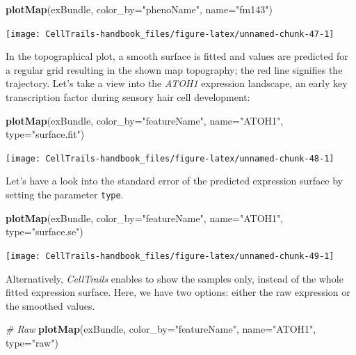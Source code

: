 \documentclass[]{book}
\newenvironment{Shaded}{\begin{snugshade}}{\end{snugshade}}
\newcommand{\KeywordTok}[1]{\textcolor[rgb]{0.13,0.29,0.53}{\textbf{#1}}}
\newcommand{\DataTypeTok}[1]{\textcolor[rgb]{0.13,0.29,0.53}{#1}}
\newcommand{\StringTok}[1]{\textcolor[rgb]{0.31,0.60,0.02}{#1}}
\newcommand{\CommentTok}[1]{\textcolor[rgb]{0.56,0.35,0.01}{\textit{#1}}}
\newcommand{\NormalTok}[1]{#1}
\theoremstyle{definition}
\theoremstyle{definition}
\theoremstyle{definition}
\theoremstyle{remark}
\begin{document}
\begin{Shaded}
\begin{Highlighting}[]
\KeywordTok{plotMap}\NormalTok{(exBundle, }\DataTypeTok{color_by=}\StringTok{"phenoName"}\NormalTok{, }\DataTypeTok{name=}\StringTok{"fm143"}\NormalTok{)}
\end{Highlighting}
\end{Shaded}

\texttt{[image: CellTrails-handbook\_files/figure-latex/unnamed-chunk-47-1]}

In the topographical plot, a smooth surface is fitted and values are
predicted for a regular grid resulting in the shown map topography; the
red line signifies the trajectory. Let's take a view into the
\emph{ATOH1} expression landscape, an early key transcription factor
during sensory hair cell development:

\begin{Shaded}
\begin{Highlighting}[]
\KeywordTok{plotMap}\NormalTok{(exBundle, }\DataTypeTok{color_by=}\StringTok{"featureName"}\NormalTok{, }\DataTypeTok{name=}\StringTok{"ATOH1"}\NormalTok{, }\DataTypeTok{type=}\StringTok{"surface.fit"}\NormalTok{)}
\end{Highlighting}
\end{Shaded}

\texttt{[image: CellTrails-handbook\_files/figure-latex/unnamed-chunk-48-1]}

Let's have a look into the standard error of the predicted expression
surface by setting the parameter \texttt{type}.

\begin{Shaded}
\begin{Highlighting}[]
\KeywordTok{plotMap}\NormalTok{(exBundle, }\DataTypeTok{color_by=}\StringTok{"featureName"}\NormalTok{, }\DataTypeTok{name=}\StringTok{"ATOH1"}\NormalTok{, }\DataTypeTok{type=}\StringTok{"surface.se"}\NormalTok{)}
\end{Highlighting}
\end{Shaded}

\texttt{[image: CellTrails-handbook\_files/figure-latex/unnamed-chunk-49-1]}

Alternatively, \emph{CellTrails} enables to show the samples only,
instead of the whole fitted expression surface. Here, we have two
options: either the raw expression or the smoothed values.

\begin{Shaded}
\begin{Highlighting}[]
\CommentTok{# Raw}
\KeywordTok{plotMap}\NormalTok{(exBundle, }\DataTypeTok{color_by=}\StringTok{"featureName"}\NormalTok{, }\DataTypeTok{name=}\StringTok{"ATOH1"}\NormalTok{, }\DataTypeTok{type=}\StringTok{"raw"}\NormalTok{)}
\end{Highlighting}
\end{Shaded}
\end{document}
